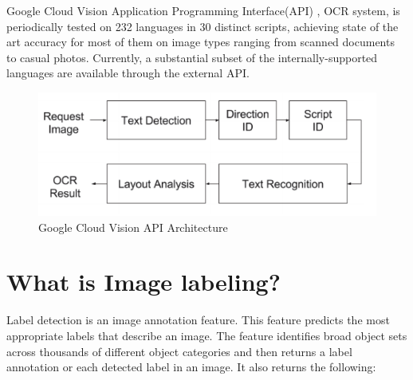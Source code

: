 \documentclass[11pt]{ucscthesis}
\begin{document}
Google Cloud Vision \cite{GoogleDocumentTextTutorial} Application Programming Interface(API) , OCR system, is periodically tested on 232 languages in 30 distinct scripts, achieving state of the art accuracy for most of them on image types ranging from scanned documents to casual photos. Currently, a substantial subset of the internally-supported languages are available through the external API.

\begin{figure}
    \centering
    \includegraphics[width =0.8\linewidth]{Fig/googleOCRpipeline.png}
    \caption{Google Cloud Vision API Architecture \cite{GoogleDocumentTextTutorial}}
    \label{Google Document Text Tutorial}
\end{figure}




\section{What is Image labeling?}

Label detection \cite{MLImageLable}is an image annotation feature. This feature predicts the most appropriate labels that describe an image. The feature identifies broad object sets across thousands of different object categories and then returns a label annotation or each detected label in an image. It also returns the following:
\end{document}

